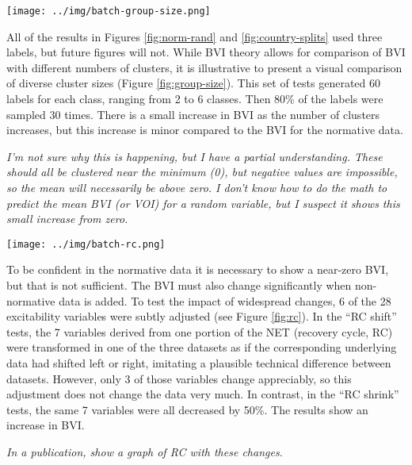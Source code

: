 \documentclass[12pt]{article}
\begin{document}
\pagebreak

\begin{figure*}
  \centering
       \texttt{[image: ../img/batch-group-size.png]}
         \caption{}
  \label{fig:group-size}
\end{figure*}

All of the results in Figures \ref{fig:norm-rand} and \ref{fig:country-splits} used three labels, but future figures will not. While BVI theory allows for comparison of BVI with different numbers of clusters, it is illustrative to present a visual comparison of diverse cluster sizes (Figure \ref{fig:group-size}). This set of tests generated 60 labels for each class, ranging from 2 to 6 classes. Then 80\% of the labels were sampled 30 times. There is a small increase in BVI as the number of clusters increases, but this increase is minor compared to the BVI for the normative data.

\emph{I'm not sure why this is happening, but I have a partial understanding. These should all be clustered near the minimum (0), but negative values are impossible, so the mean will necessarily be above zero. I don't know how to do the math to predict the mean BVI (or VOI) for a random variable, but I suspect it shows this small increase from zero.}

\pagebreak

\begin{figure*}
  \centering
       \texttt{[image: ../img/batch-rc.png]}
         \caption{}
  \label{fig:rc}
\end{figure*}

To be confident in the normative data it is necessary to show a near-zero BVI, but that is not sufficient. The BVI must also change significantly when non-normative data is added. To test the impact of widespread changes, 6 of the 28 excitability variables were subtly adjusted (see Figure \ref{fig:rc}). In the ``RC shift'' tests, the 7 variables derived from one portion of the NET (recovery cycle, RC) were transformed in one of the three datasets as if the corresponding underlying data had shifted left or right, imitating a plausible technical difference between datasets. However, only 3 of those variables change appreciably, so this adjustment does not change the data very much. In contrast, in the ``RC shrink'' tests, the same 7 variables were all decreased by 50\%. The results show an increase in BVI.

\emph{In a publication, show a graph of RC with these changes.}
\end{document}
